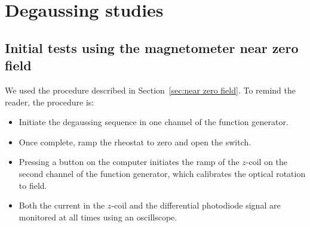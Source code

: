  
   
\section{Degaussing studies\label{sec:degaussing}}

\subsection{Initial tests using the magnetometer near zero field}

   
  

We used the procedure described in Section~\ref{sec:near zero field}.
To remind the reader, the procedure is:
\begin{itemize}
\item Initiate the degaussing sequence in one channel of the function
  generator.
\item Once complete, ramp the rheostat to zero and open the switch.
\item Pressing a button on the computer initiates the ramp of the
  $z$-coil on the second channel of the function generator, which
  calibrates the optical rotation to field.
\item Both the current in the $z$-coil and the differential photodiode
  signal are monitored at all times using an oscillscope.
\end{itemize}


